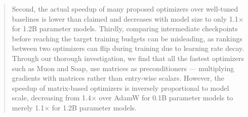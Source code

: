 \documentclass{article}
\begin{document}
\begin{abstract}
Second, the actual speedup of many proposed optimizers over well-tuned baselines is lower than claimed and decreases with model size to only 1.1$\times$ for 1.2B parameter models. Thirdly, comparing intermediate checkpoints before reaching the target training budgets can be misleading, as rankings between two optimizers can flip during training due to learning rate decay.
Through our thorough investigation, we find that all the fastest optimizers such as Muon and Soap, use matrices as preconditioners --- multiplying gradients with matrices rather than entry-wise scalars. However, the speedup of matrix-based optimizers is inversely proportional to model scale, decreasing from 1.4$\times$ over AdamW for 0.1B parameter models to merely 1.1$\times$ for 1.2B parameter models.
\end{abstract}







\newpage

  

\newpage
\appendix



\end{document}
